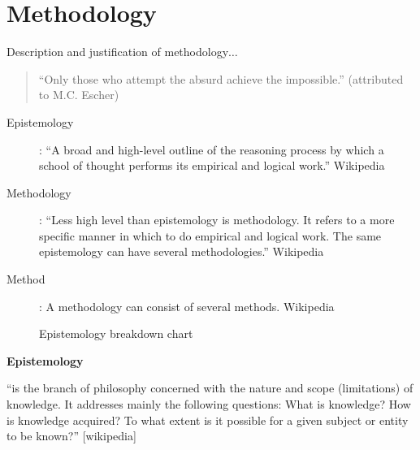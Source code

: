 
\chapter{Methodology}
\label{ch:method}

\startcontents[chapters]
\minicontents

\begin{shaded}
  Description and justification of methodology$\ldots$
\end{shaded}

\begin{quote}
  ``Only those who attempt the absurd achieve the impossible.'' (attributed to M.C. Escher)
\end{quote}


\begin{description}
  \item [Epistemology]:	``A broad and high-level outline of the reasoning process by which a school of thought performs its empirical and logical work.'' Wikipedia
  \item [Methodology]: ``Less high level than epistemology is methodology. It refers to a more specific manner in which to do empirical and logical work. The same epistemology can have several methodologies.'' Wikipedia
  \item [Method]:	A methodology can consist of several methods. Wikipedia
\end{description}

\begin{figure}[htb]
  \centering
  \caption[Epistemology]{Epistemology breakdown chart}
\label{fig:method}
\end{figure}

\textbf{Epistemology}

``is the branch of philosophy concerned with the nature and scope (limitations) of knowledge. It addresses mainly the following questions: What is knowledge? How is knowledge acquired? To what extent is it possible for a given subject or entity to be known?'' [wikipedia]

